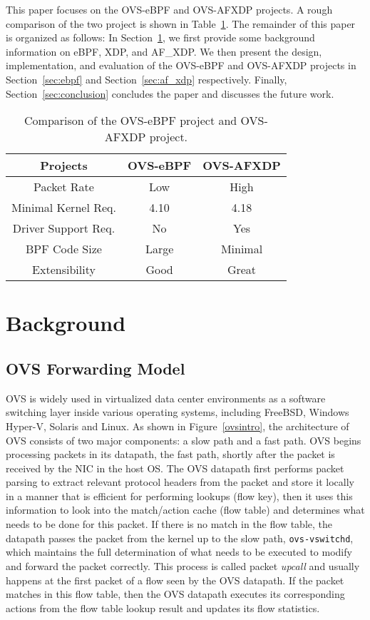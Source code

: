 \documentclass[10pt]{sigplanconf}
\begin{document}
This paper focuses on the OVS-eBPF and OVS-AFXDP projects.
A rough comparison of the two project is shown in Table~\ref{proj-compare}.
The remainder of this paper is organized as follows:
In Section~\ref{sec:background}, we first provide some background information
on eBPF, XDP, and AF\_XDP.  We then present the design, implementation, and
evaluation of the OVS-eBPF and OVS-AFXDP projects in Section~\ref{sec:ebpf}
and Section~\ref{sec:af_xdp} respectively. Finally,
Section~\ref{sec:conclusion} concludes the paper and discusses the future work.

\begin{table}
\centering
\scriptsize
\begin{tabular}{|c | c | c|}
\hline
 {\bf Projects} & {\bf OVS-eBPF } & {\bf OVS-AFXDP} \\ \hline\hline
  Packet Rate & Low & High \\ \hline
  Minimal Kernel Req. & 4.10 & 4.18 \\ \hline
  Driver Support Req. & No & Yes \\ \hline
  BPF Code Size & Large & Minimal \\ \hline
  Extensibility & Good & Great \\ \hline
  \end{tabular}
\caption{\footnotesize
Comparison of the OVS-eBPF project and OVS-AFXDP project.
}
\label{proj-compare}
\end{table}

\section{Background}
\label{sec:background}

\subsection{OVS Forwarding Model}
OVS is widely used in virtualized data center environments as a software
switching layer inside various operating systems, including FreeBSD,
Windows Hyper-V, Solaris and Linux. As shown in
Figure~\ref{ovsintro}, the architecture of OVS consists of two major
components: a slow path and a fast path. OVS begins processing packets
in its datapath, the fast path, shortly after the packet is received by the NIC in the host OS.
The OVS datapath first performs packet parsing to extract relevant protocol
headers from the packet and store it locally in a manner that is efficient for
performing lookups (flow key), then it uses this information to look into the
match/action cache (flow table) and determines what needs to be done for this
packet. If there is no match in the flow table, the datapath passes the packet
from the kernel up to the slow path, \verb+ovs-vswitchd+, which maintains the
full determination of what needs to be executed to modify and forward
the packet correctly.  This process is called packet {\em upcall} and
usually happens at the first packet of a flow seen by the OVS datapath.
If the packet matches in this flow table, then the OVS datapath executes its
corresponding actions from the flow table lookup result and updates its flow
statistics.
\end{document}
